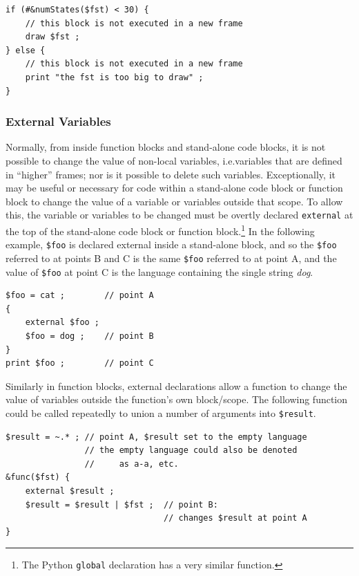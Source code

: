 \documentclass[letterpaper,12pt]{article}
\begin{document}
\begin{Verbatim}[fontsize=\small]
if (#&numStates($fst) < 30) {
    // this block is not executed in a new frame
    draw $fst ;
} else {
    // this block is not executed in a new frame
    print "the fst is too big to draw" ;
}
\end{Verbatim}


\subsubsection{External Variables}

Normally, from inside function blocks and stand-alone code blocks,
it is not possible to change the value of non-local variables,
i.e.\@ variables that are defined in ``higher'' frames; nor is it
possible to delete such variables.  Exceptionally, it may be useful
or necessary for code within a stand-alone code block or function
block to change the value of a variable or variables outside that
scope.  To allow this, the variable or variables to be changed must
be overtly declared \texttt{external} at the top of the stand-alone
code block or function block.\footnote{The Python \texttt{global}
declaration has a very similar function.}  In the following
example, \verb!$foo! is declared external inside a stand-alone
block, and so the \verb!$foo! referred to at points B and C is the
same \verb!$foo! referred to at point A, and the value of
\verb!$foo! at point C is the language containing the single string
\emph{dog}.

\begin{samepage}
\begin{Verbatim}[fontsize=\small]
$foo = cat ;        // point A
{
    external $foo ; 
    $foo = dog ;    // point B
}
print $foo ;        // point C
\end{Verbatim}
\end{samepage}

\noindent
Similarly in function blocks, external declarations allow a function to change the value
of variables outside the function's own block/scope.  The following function could be
called repeatedly to union a number of arguments into \verb!$result!.

\begin{samepage}
\begin{Verbatim}[fontsize=\small]
$result = ~.* ; // point A, $result set to the empty language
                // the empty language could also be denoted 
                //     as a-a, etc.
&func($fst) {
    external $result ;
    $result = $result | $fst ;  // point B: 
                                // changes $result at point A
}
\end{Verbatim}
\end{samepage}
\end{document}

